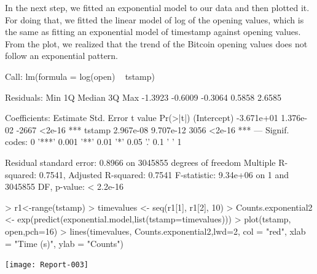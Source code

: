 \documentclass{article}
\begin{document}
In the next step, we fitted an exponential model to our data and then plotted it. For doing that, we fitted the linear model of log of the opening values, which is the same as fitting an exponential model of timestamp against opening values. From the plot, we realized that the trend of the Bitcoin opening values does not follow an exponential pattern.
\begin{Schunk}
\begin{Soutput}
Call:
lm(formula = log(open) ~ tstamp)

Residuals:
    Min      1Q  Median      3Q     Max 
-1.3923 -0.6009 -0.3064  0.5858  2.6585 

Coefficients:
              Estimate Std. Error t value Pr(>|t|)    
(Intercept) -3.671e+01  1.376e-02   -2667   <2e-16 ***
tstamp       2.967e-08  9.707e-12    3056   <2e-16 ***
---
Signif. codes:  0 '***' 0.001 '**' 0.01 '*' 0.05 '.' 0.1 ' ' 1

Residual standard error: 0.8966 on 3045855 degrees of freedom
Multiple R-squared:  0.7541,	Adjusted R-squared:  0.7541 
F-statistic: 9.34e+06 on 1 and 3045855 DF,  p-value: < 2.2e-16
\end{Soutput}
\begin{Sinput}
> r1<-range(tstamp)
> timevalues <- seq(r1[1], r1[2], 10)
> Counts.exponential2 <- exp(predict(exponential.model,list(tstamp=timevalues)))
> plot(tstamp, open,pch=16)
> lines(timevalues, Counts.exponential2,lwd=2, col = "red", xlab = "Time (s)", ylab = "Counts")
\end{Sinput}
\end{Schunk}
\texttt{[image: Report-003]}
	
\end{document}
